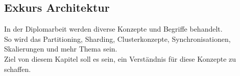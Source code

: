 
\begin{flushleft}
    \subsection{Exkurs Architektur}
    In der Diplomarbeit werden diverse Konzepte und Begriffe behandelt.\\
    So wird das Partitioning, Sharding, Clusterkonzepte, Synchronisationen, Skalierungen und mehr Thema sein.\\
    Ziel von diesem Kapitel soll es sein, ein Verständnis für diese Konzepte zu schaffen.
%    
    
    
    
    
    
    
\end{flushleft}